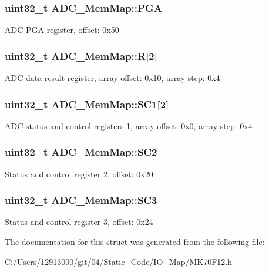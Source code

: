 \subsubsection[{P\+G\+A}]{\setlength{\rightskip}{0pt plus 5cm}uint32\+\_\+t A\+D\+C\+\_\+\+Mem\+Map\+::\+P\+G\+A}\label{struct_a_d_c___mem_map_a3c43d657acb03daee1a6abbb58206a56}
A\+D\+C P\+G\+A register, offset\+: 0x50 \hypertarget{struct_a_d_c___mem_map_acbd8ded0e3f30d8502e9b9229e092fe8}{}
\subsubsection[{R}]{\setlength{\rightskip}{0pt plus 5cm}uint32\+\_\+t A\+D\+C\+\_\+\+Mem\+Map\+::\+R\mbox{[}2\mbox{]}}\label{struct_a_d_c___mem_map_acbd8ded0e3f30d8502e9b9229e092fe8}
A\+D\+C data result register, array offset\+: 0x10, array step\+: 0x4 \hypertarget{struct_a_d_c___mem_map_ab3900b4bfe889cd9d04850d121394741}{}
\subsubsection[{S\+C1}]{\setlength{\rightskip}{0pt plus 5cm}uint32\+\_\+t A\+D\+C\+\_\+\+Mem\+Map\+::\+S\+C1\mbox{[}2\mbox{]}}\label{struct_a_d_c___mem_map_ab3900b4bfe889cd9d04850d121394741}
A\+D\+C status and control registers 1, array offset\+: 0x0, array step\+: 0x4 \hypertarget{struct_a_d_c___mem_map_ad7caff2bf5e2dfb2159d174af24dc693}{}
\subsubsection[{S\+C2}]{\setlength{\rightskip}{0pt plus 5cm}uint32\+\_\+t A\+D\+C\+\_\+\+Mem\+Map\+::\+S\+C2}\label{struct_a_d_c___mem_map_ad7caff2bf5e2dfb2159d174af24dc693}
Status and control register 2, offset\+: 0x20 \hypertarget{struct_a_d_c___mem_map_a68295218c104f78bc2b11f04c06ce55e}{}
\subsubsection[{S\+C3}]{\setlength{\rightskip}{0pt plus 5cm}uint32\+\_\+t A\+D\+C\+\_\+\+Mem\+Map\+::\+S\+C3}\label{struct_a_d_c___mem_map_a68295218c104f78bc2b11f04c06ce55e}
Status and control register 3, offset\+: 0x24 

The documentation for this struct was generated from the following file\+:\begin{DoxyCompactItemize}
\item 
C\+:/\+Users/12913000/git/04/\+Static\+\_\+\+Code/\+I\+O\+\_\+\+Map/\hyperlink{_m_k70_f12_8h}{M\+K70\+F12.\+h}\end{DoxyCompactItemize}
